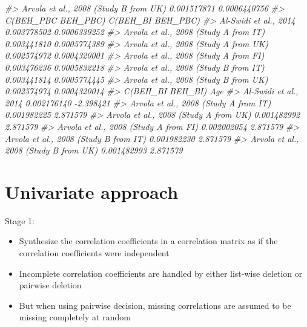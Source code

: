 \documentclass[
]{book}
\newenvironment{Shaded}{\begin{snugshade}}{\end{snugshade}}
\newcommand{\CommentTok}[1]{\textcolor[rgb]{0.56,0.35,0.01}{\textit{#1}}}
\begin{document}
\begin{Shaded}
\begin{Highlighting}[]
\CommentTok{\#\textgreater{} Arvola et al., 2008 (Study B from UK)       0.001517871     0.0006440756}
\CommentTok{\#\textgreater{}                                       C(BEH\_PBC BEH\_PBC) C(BEH\_BI BEH\_PBC)}
\CommentTok{\#\textgreater{} Al{-}Swidi et al., 2014                        0.003778502      0.0006339252}
\CommentTok{\#\textgreater{} Arvola et al., 2008 (Study A from IT)        0.003441810      0.0005774389}
\CommentTok{\#\textgreater{} Arvola et al., 2008 (Study A from UK)        0.002574972      0.0004320001}
\CommentTok{\#\textgreater{} Arvola et al., 2008 (Study A from FI)        0.003476236      0.0005832218}
\CommentTok{\#\textgreater{} Arvola et al., 2008 (Study B from IT)        0.003441814      0.0005774445}
\CommentTok{\#\textgreater{} Arvola et al., 2008 (Study B from UK)        0.002574974      0.0004320014}
\CommentTok{\#\textgreater{}                                       C(BEH\_BI BEH\_BI)       Age}
\CommentTok{\#\textgreater{} Al{-}Swidi et al., 2014                      0.002176140 {-}2.398421}
\CommentTok{\#\textgreater{} Arvola et al., 2008 (Study A from IT)      0.001982225  2.871579}
\CommentTok{\#\textgreater{} Arvola et al., 2008 (Study A from UK)      0.001482992  2.871579}
\CommentTok{\#\textgreater{} Arvola et al., 2008 (Study A from FI)      0.002002054  2.871579}
\CommentTok{\#\textgreater{} Arvola et al., 2008 (Study B from IT)      0.001982230  2.871579}
\CommentTok{\#\textgreater{} Arvola et al., 2008 (Study B from UK)      0.001482993  2.871579}
\end{Highlighting}
\end{Shaded}

\hypertarget{univariate-approach}{%
\section{Univariate approach}\label{univariate-approach}}

\citep{viswesvaran1995}

Stage 1:

\begin{itemize}
\item
  Synthesize the correlation coefficients in a correlation matrix as if the correlation coefficients were independent
\item
  Incomplete correlation coefficients are handled by either list-wise deletion or pairwise deletion
\item
  But when using pairwise decision, missing correlations are assumed to be missing completely at random
\end{itemize}
\end{document}
